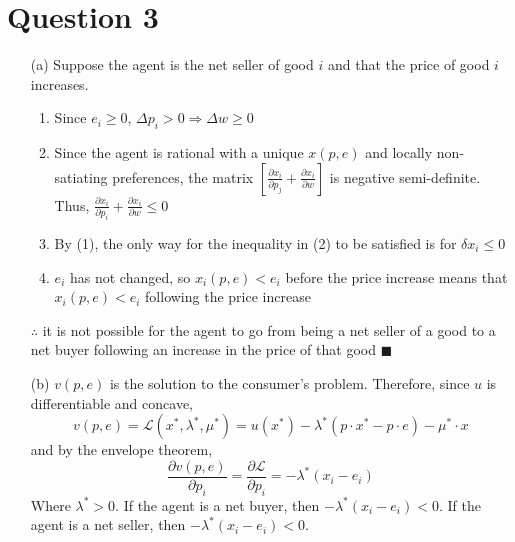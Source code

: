 \documentclass{article}
\renewcommand{\L}{\mathcal{L}}
\begin{document}
\pagebreak
\section*{Question 3}
\begin{itemize}
	\item[(a)] Suppose the agent is the net seller of good $i$ and that the price of good $i$ increases.
		\begin{enumerate} 
			\item Since $e_i\geq 0$, $\Delta p_i>0\Rightarrow\Delta w\geq 0$
			\item Since the agent is rational with a unique $x(p,e)$ and locally non-satiating preferences, the matrix ${[\frac{\partial x_i}{\partial p_j}+\frac{\partial x_i}{\partial w}]}$ is negative semi-definite. Thus, ${\frac{\partial x_i}{\partial p_i}+\frac{\partial x_i}{\partial w}\leq 0}$
			\item By (1), the only way for the inequality in (2) to be satisfied is for $\delta x_i\leq 0$
			\item $e_i$ has not changed, so $x_i(p,e)<e_i$ before the price increase means that $x_i(p,e)<e_i$ following the price increase
		\end{enumerate}
		$\therefore$ it is not possible for the agent to go from being a net seller of a good to a net buyer following an increase in the price of that good $\blacksquare$
	
	\item[(b)] $v(p,e)$ is the solution to the consumer's problem. Therefore, since $u$ is differentiable and concave,
		\[
			v(p,e)=\L(x^*,\lambda^*,\mu^*) = u(x^*)-\lambda^*(p\cdot x^*-p\cdot e) - \mu^*\cdot x
		\]
		and by the envelope theorem,
		\[
			\frac{\partial v(p,e)}{\partial p_i} = \frac{\partial\L}{\partial p_i} = -\lambda^*(x_i - e_i)
		\]
		Where $\lambda^*>0$. If the agent is a net buyer, then $-\lambda^*(x_i - e_i)<0$. If the agent is a net seller, then $-\lambda^*(x_i - e_i)<0$.
	
\end{itemize}



\end{document}
